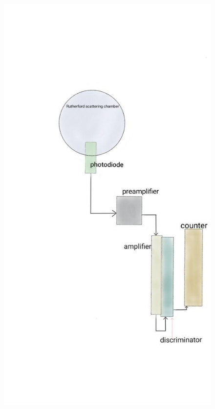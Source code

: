 \documentclass[a4paper]{article}
\begin{document}
\begin{figure}[H]
\centering
\includegraphics[width=1\textwidth]{diagram.png}
\label{Circuit_Diagram}
\end{figure}
\end{document}
